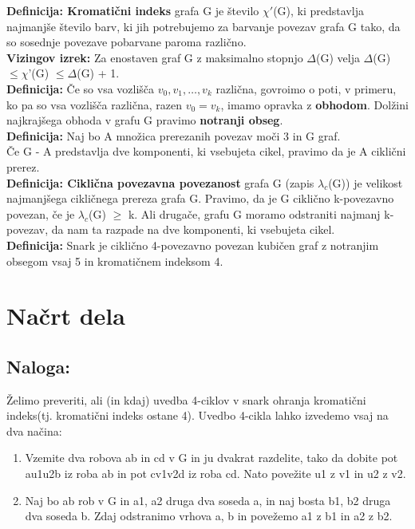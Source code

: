 \documentclass[a4paper,12pt]{article}
\begin{document}
\noindent \textbf{Definicija: Kromatični indeks} grafa G je število $\chi'$(G), ki predstavlja najmanjše
število barv, ki jih potrebujemo za barvanje povezav grafa G tako, da so sosednje povezave pobarvane paroma različno.\\

\noindent \textbf{Vizingov izrek:} Za enostaven graf G z maksimalno stopnjo $\Delta$(G) velja
$\Delta$(G) $\leq \chi$'(G) $\leq \Delta$(G) + 1. \\

\noindent \textbf{Definicija:} Če so vsa vozlišča $v_0,v_1, \dots, v_k$ različna,
govroimo o poti, v primeru, ko pa so vsa vozlišča različna, razen $v_0 = v_k$,
imamo opravka z \textbf{obhodom}. Dolžini najkrajšega obhoda v grafu G pravimo
\textbf{notranji obseg}.\\

\noindent \textbf{Definicija:} Naj bo A množica prerezanih povezav moči 3 in G graf.\\
 Če G - A predstavlja dve komponenti, ki vsebujeta cikel, pravimo da je A ciklični prerez.\\

\noindent \textbf{Definicija: Ciklična povezavna povezanost} grafa G (zapis $\lambda_c$(G)) je velikost najmanjšega cikličnega prereza grafa G. Pravimo, da je G ciklično 
k-povezavno povezan, če je $\lambda_c$(G) $\geq$ k. Ali drugače, grafu G moramo odstraniti najmanj k-povezav, da nam ta razpade na dve komponenti, ki vsebujeta cikel.\\

\noindent \textbf{Definicija:} Snark je ciklično 4-povezavno povezan kubičen graf
z notranjim obsegom vsaj 5 in kromatičnem indeksom 4. \\

\newpage

\section{Načrt dela}

\noindent \subsection*{\large Naloga:} Želimo preveriti, ali (in kdaj) uvedba 4-ciklov v snark ohranja kromatični
indeks(tj. kromatični indeks ostane 4). Uvedbo 4-cikla lahko izvedemo
vsaj na dva načina:
\begin{enumerate}
    \item Vzemite dva robova ab in cd v G in ju dvakrat razdelite, tako da dobite
    pot au1u2b iz roba ab in pot cv1v2d iz roba cd. Nato povežite u1 z v1
    in u2 z v2.
    \item Naj bo ab rob v G in a1, a2 druga dva soseda a, in naj bosta b1, b2
    druga dva soseda b. Zdaj odstranimo vrhova a, b in povežemo a1 z b1
    in a2 z b2.
\end{enumerate}
\end{document}
